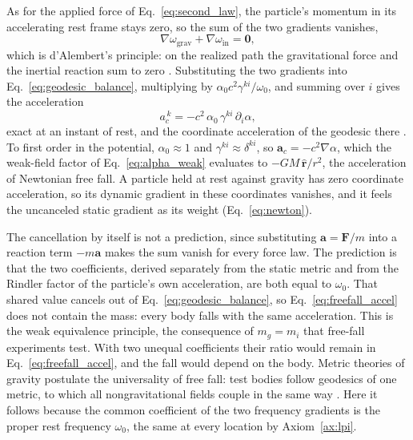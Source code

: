 \documentclass[aps,prd,onecolumn,tightenlines,nofootinbib,notitlepage,11pt,floatfix]{revtex4-2}
\theoremstyle{indentedtheorem}
\begin{document}
As for the applied force of Eq.~\eqref{eq:second_law}, the particle's momentum in its accelerating rest frame stays zero, so the sum of the two gradients vanishes,
\begin{equation}
    \nabla\omega_\text{grav}+\nabla\omega_\text{in} = \mathbf{0} ,
    \label{eq:geodesic_balance}
\end{equation}
which is d'Alembert's principle: on the realized path the gravitational force and the inertial reaction sum to zero \citep{DAlembert1743Traite,Lagrange1788Mecanique,Goldstein2002Classical}. Substituting the two gradients into Eq.~\eqref{eq:geodesic_balance}, multiplying by $\alpha_0c^2\gamma^{ki}/\omega_0$, and summing over $i$ gives the acceleration
\begin{equation}
    a_c^{\,k} = -c^2 \, \alpha_0 \, \gamma^{ki} \, \partial_i\alpha ,
    \label{eq:freefall_accel}
\end{equation}
exact at an instant of rest, and the coordinate acceleration of the geodesic there \citep{MTW1973Gravitation}. To first order in the potential, $\alpha_0\approx1$ and $\gamma^{ki}\approx\delta^{ki}$, so $\mathbf{a}_c=-c^2\nabla\alpha$, which the weak-field factor of Eq.~\eqref{eq:alpha_weak} evaluates to $-GM \, \hat{\mathbf{r}}/r^2$, the acceleration of Newtonian free fall. A particle held at rest against gravity has zero coordinate acceleration, so its dynamic gradient in these coordinates vanishes, and it feels the uncanceled static gradient as its weight (Eq.~\eqref{eq:newton}).

The cancellation by itself is not a prediction, since substituting $\mathbf{a}=\mathbf{F}/m$ into a reaction term $-m\mathbf{a}$ makes the sum vanish for every force law. The prediction is that the two coefficients, derived separately from the static metric and from the Rindler factor of the particle's own acceleration, are both equal to $\omega_0$. That shared value cancels out of Eq.~\eqref{eq:geodesic_balance}, so Eq.~\eqref{eq:freefall_accel} does not contain the mass: every body falls with the same acceleration. This is the weak equivalence principle, the consequence of $m_g=m_i$ that free-fall experiments test. With two unequal coefficients their ratio would remain in Eq.~\eqref{eq:freefall_accel}, and the fall would depend on the body. Metric theories of gravity postulate the universality of free fall: test bodies follow geodesics of one metric, to which all nongravitational fields couple in the same way \citep{Will2014Confrontation}. Here it follows because the common coefficient of the two frequency gradients is the proper rest frequency $\omega_0$, the same at every location by Axiom~\ref{ax:lpi}.
\end{document}
